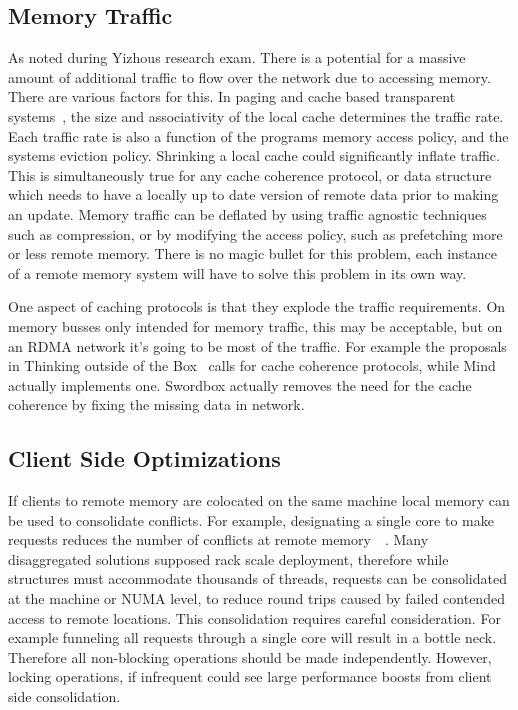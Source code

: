\subsection{Memory Traffic} As noted during Yizhous research exam. There is a
potential for a massive amount of additional traffic to flow over the network
due to accessing memory. There are various factors for this. In paging and cache
based transparent systems~\cite{fastswap,kona,gms,infiniswap,legoos,lite}, the
size and associativity of the local cache determines the traffic rate. Each
traffic rate is also a function of the programs memory access policy, and the
systems eviction policy. Shrinking a local cache could significantly inflate
traffic. This is simultaneously true for any cache coherence protocol, or data
structure which needs to have a locally up to date version of remote data prior
to making an update. Memory traffic can be deflated by using traffic agnostic
techniques such as compression, or by modifying the access policy, such as
prefetching more or less remote memory. There is no magic bullet for this
problem, each instance of a remote memory system will have to solve this problem
in its own way.

One aspect of caching protocols is that they explode the traffic requirements.
On memory busses only intended for memory traffic, this may be acceptable, but
on an RDMA network it's going to be most of the traffic. For example the
proposals in Thinking outside of the Box~\cite{design-far-memory-struct} calls
for cache coherence protocols, while Mind~\cite{mind} actually implements one.
Swordbox actually removes the need for the cache coherence by fixing the missing
data in network.

\subsection{Client Side Optimizations}

If clients to remote memory are colocated on the same machine local memory can
be used to consolidate conflicts. For example, designating a single core to make
requests reduces the number of conflicts at remote
memory~\cite{flat-combine}~\cite{sherman}. Many disaggregated solutions supposed
rack scale deployment, therefore while structures must accommodate thousands of
threads, requests can be consolidated at the machine or NUMA level, to reduce
round trips caused by failed contended access to remote locations. This
consolidation requires careful consideration. For example funneling all requests
through a single core will result in a bottle neck. Therefore all non-blocking
operations should be made independently. However, locking operations, if
infrequent could see large performance boosts from client side consolidation.

